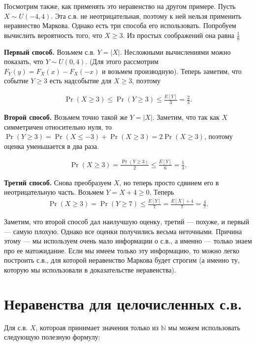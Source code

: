 \documentclass[12pt]{article}
\newcommand\N{\mathbb{N}}
\begin{document}
Посмотрим также, как применять это неравенство на другом примере. Пусть $X \sim U(-4, 4)$. Эта с.в. не неотрицательная, поэтому к ней нельзя применить неравнество Маркова. Однако есть три способа его использовать. Попробуем вычислить вероятность того, что $X \ge 3$. Из простых соображений она равна $\frac{1}{8}$

\textbf{Первый способ.} Возьмем с.в. $Y = |X|$. Несложными вычислениями можно показать, что $Y \sim U(0, 4)$. (Для этого рассмотрим $F_Y(y) = F_X(x) - F_X(-x)$ и возьмем производную). Теперь заметим, что событие $Y \ge 3$ есть надсобытие для $X \ge 3$, поэтому

\begin{align*}
  \Pr(X \ge 3) \le \Pr(Y \ge 3) \le \frac{E[Y]}{3} = \frac{2}{3}.
\end{align*}

\textbf{Второй способ.} Возьмем точно такой же $Y = |X|$. Заметим, что так как $X$ симметричен относительно нуля, то $\Pr(Y \ge 3) = \Pr(X \le -3) + \Pr(X \ge 3) = 2\Pr(X \ge 3)$, поэтому оценка уменьшается в два раза.

\begin{align*}
  \Pr(X \ge 3) = \frac{\Pr(Y \ge 3)}{2} \le \frac{E[Y]}{6} = \frac{1}{3}.
\end{align*}

\textbf{Третий способ.} Снова преобразуем $X$, но теперь просто сдвинем его в неотрицательную часть. Возьмем $Y = X + 4 \ge 0$. Теперь 
\begin{align*}
  \Pr(X \ge 3) = \Pr(Y \ge 7) \le \frac{E[Y]}{7} = \frac{E[X] + 4}{7} = \frac{4}{7}.
\end{align*}

Заметим, что второй способ дал наилучшую оценку, третий --- похуже, и первый --- самую плохую. Однако все оценки получились весьма неточными. Причина этому --- мы используем очень мало информации о с.в., а именно --- только знаем про ее матожидание. Если мы имеем только эту информацию, то можно легко построить с.в., для которой неравенство Маркова будет строгим (а именно ту, которую мы использовали в доказательстве неравенства).

\section{Неравенства для целочисленных с.в.}

Для с.в. $X$, котороая принимает значения только из $\N$ мы можем использовать следующую полезную формулу:


\begin{center}
\end{center}
\end{document}

